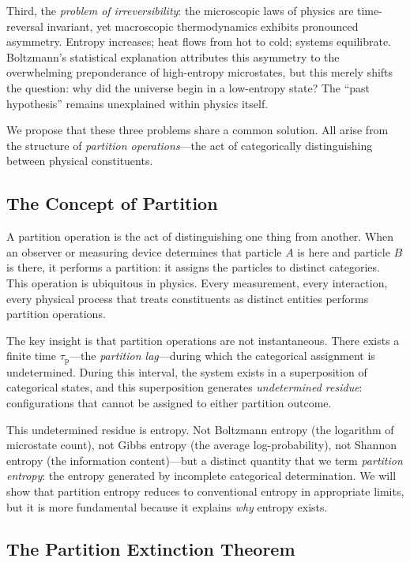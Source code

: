 \documentclass[twocolumn,10pt,aps,prd,superscriptaddress,nofootinbib]{revtex4-2}
\theoremstyle{remark}
\newcommand{\tauP}{\tau_{\mathrm{p}}}
\begin{document}
Third, the \emph{problem of irreversibility}: the microscopic laws of physics are time-reversal invariant, yet macroscopic thermodynamics exhibits pronounced asymmetry. Entropy increases; heat flows from hot to cold; systems equilibrate. Boltzmann's statistical explanation \cite{boltzmann1872,boltzmann1877} attributes this asymmetry to the overwhelming preponderance of high-entropy microstates, but this merely shifts the question: why did the universe begin in a low-entropy state? The ``past hypothesis'' \cite{albert2000,penrose1989} remains unexplained within physics itself.

We propose that these three problems share a common solution. All arise from the structure of \emph{partition operations}---the act of categorically distinguishing between physical constituents.

\subsection{The Concept of Partition}

A partition operation is the act of distinguishing one thing from another. When an observer or measuring device determines that particle $A$ is here and particle $B$ is there, it performs a partition: it assigns the particles to distinct categories. This operation is ubiquitous in physics. Every measurement, every interaction, every physical process that treats constituents as distinct entities performs partition operations.

The key insight is that partition operations are not instantaneous. There exists a finite time $\tauP$---the \emph{partition lag}---during which the categorical assignment is undetermined. During this interval, the system exists in a superposition of categorical states, and this superposition generates \emph{undetermined residue}: configurations that cannot be assigned to either partition outcome.

This undetermined residue is entropy. Not Boltzmann entropy (the logarithm of microstate count), not Gibbs entropy (the average log-probability), not Shannon entropy (the information content)---but a distinct quantity that we term \emph{partition entropy}: the entropy generated by incomplete categorical determination. We will show that partition entropy reduces to conventional entropy in appropriate limits, but it is more fundamental because it explains \emph{why} entropy exists.

\subsection{The Partition Extinction Theorem}
\end{document}
